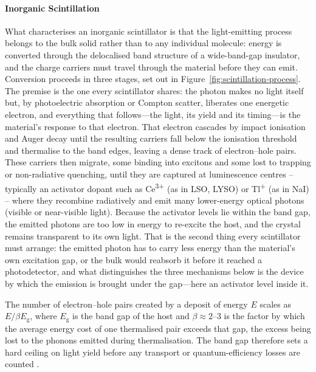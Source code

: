 \paragraph{Inorganic Scintillation}
What characterises an inorganic scintillator is that the light-emitting process belongs to the bulk solid rather than to any individual molecule: energy is converted through the delocalised band structure of a wide-band-gap insulator, and the charge carriers must travel through the material before they can emit.
Conversion proceeds in three stages, set out in Figure~\ref{fig:scintillation-process}.
The premise is the one every scintillator shares: the  photon makes no light itself but, by photoelectric absorption or Compton scatter, liberates one energetic electron, and everything that follows---the light, its yield and its timing---is the material's response to that electron.
That electron cascades by impact ionisation and Auger decay until the resulting carriers fall below the ionisation threshold and thermalise to the band edges, leaving a dense track of electron--hole pairs.
These carriers then migrate, some binding into excitons and some lost to trapping or non-radiative quenching, until they are captured at luminescence centres -- typically an activator dopant such as Ce\textsuperscript{3+} (as in LSO, LYSO) or Tl\textsuperscript{+} (as in NaI) -- where they recombine radiatively and emit many lower-energy optical photons (visible or near-visible light).
Because the activator levels lie within the band gap, the emitted photons are too low in energy to re-excite the host, and the crystal remains transparent to its own light.
That is the second thing every scintillator must arrange: the emitted photon has to carry less energy than the material's own excitation gap, or the bulk would reabsorb it before it reached a photodetector, and what distinguishes the three mechanisms below is the device by which the emission is brought under the gap---here an activator level inside it.

The number of electron--hole pairs created by a deposit of energy $E$ scales as $E/\beta E_\mathrm{g}$, where $E_\mathrm{g}$ is the band gap of the host and $\beta \approx 2$--$3$ is the factor by which the average energy cost of one thermalised pair exceeds that gap, the excess being lost to the phonons emitted during thermalisation.
The band gap therefore sets a hard ceiling on light yield before any transport or quantum-efficiency losses are counted \cite{Lempicki1993}.

